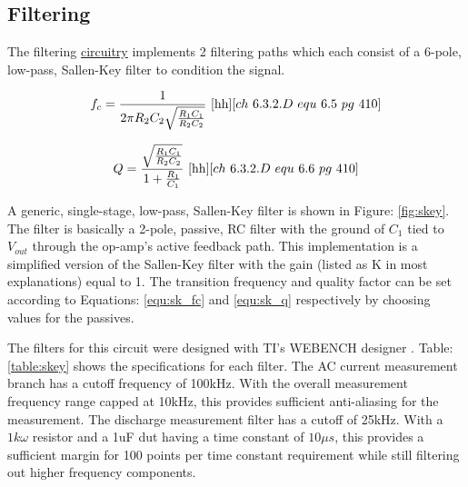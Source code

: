 \subsection{Filtering}
\label{sec:filtering}
\nocite{kirk_skey}

The filtering \hyperlink{sch:filtering}{circuitry} implements 2 filtering paths which each consist of a 6-pole, low-pass, Sallen-Key filter to condition the signal.



\begin{equation}
    \label{equ:sk_fc}
    f_c = \frac{1}{2\pi R_2C_2\sqrt{\frac{R_1C_1}{R_2C_2}}}
    ~\cite{hh}[ch~6.3.2.D~equ~6.5~pg~410]
\end{equation}

\begin{equation}
    \label{equ:sk_q}
    Q = \frac{\sqrt{\frac{R_1C_1}{R_2C_2}}}{1 + \frac{R_1}{C_1}}
    ~\cite{hh}[ch~6.3.2.D~equ~6.6~pg~410]
\end{equation}

A generic, single-stage, low-pass, Sallen-Key filter is shown in Figure: \ref{fig:skey}. The filter is basically a 2-pole, passive, RC filter with the ground of $C_1$ tied to $V_{out}$ through the op-amp's active feedback path. This implementation is a simplified version of the Sallen-Key filter with the gain (listed as K in most explanations) equal to 1. The transition frequency and quality factor can be set according to Equations: \eqref{equ:sk_fc} and \eqref{equ:sk_q} respectively by choosing values for the passives.



The filters for this circuit were designed with TI's WEBENCH designer \cite{webench}. Table: \ref{table:skey} shows the specifications for each filter. 
The AC current measurement branch has a cutoff frequency of 100kHz. With the overall measurement frequency range capped at 10kHz, this provides sufficient anti-aliasing for the measurement. The discharge measurement filter has a cutoff of 25kHz. With a $1k\omega$ resistor and a 1uF \gls{dut} having a time constant of $10\mu s$, this provides a sufficient margin for 100 points per time constant requirement while still filtering out higher frequency components.

